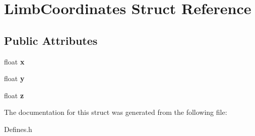 \hypertarget{structLimbCoordinates}{
\section{LimbCoordinates Struct Reference}
\label{structLimbCoordinates}
}
\subsection*{Public Attributes}
\begin{DoxyCompactItemize}
\item 
\hypertarget{structLimbCoordinates_ab2e4302ad3f0dca1b90c191372b369c9}{
float {\bfseries x}}
\label{structLimbCoordinates_ab2e4302ad3f0dca1b90c191372b369c9}

\item 
\hypertarget{structLimbCoordinates_ace36fd5842192df47b481d777cc1589e}{
float {\bfseries y}}
\label{structLimbCoordinates_ace36fd5842192df47b481d777cc1589e}

\item 
\hypertarget{structLimbCoordinates_ae367ee3e85baccb4be01c18a4c55510f}{
float {\bfseries z}}
\label{structLimbCoordinates_ae367ee3e85baccb4be01c18a4c55510f}

\end{DoxyCompactItemize}


The documentation for this struct was generated from the following file:\begin{DoxyCompactItemize}
\item 
Defines.h\end{DoxyCompactItemize}
